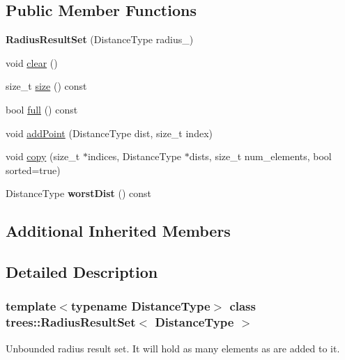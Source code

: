 \subsection*{Public Member Functions}
\begin{DoxyCompactItemize}
\item 
\mbox{\label{classtrees_1_1_radius_result_set_a0db3556f2cbe54ef66ca8c3f1d753592}} 
{\bfseries Radius\+Result\+Set} (Distance\+Type radius\+\_\+)
\item 
void \hyperlink{classtrees_1_1_radius_result_set_a4e41825c25577341937de798be4ab659}{clear} ()
\item 
size\+\_\+t \hyperlink{classtrees_1_1_radius_result_set_a4ac769fcfb64d84d46d0eb233d4681da}{size} () const
\item 
bool \hyperlink{classtrees_1_1_radius_result_set_a25ad92a894e2b78556bb3c781b2cc173}{full} () const
\item 
void \hyperlink{classtrees_1_1_radius_result_set_a65652623444c8beb35a1d27a86117b2a}{add\+Point} (Distance\+Type dist, size\+\_\+t index)
\item 
void \hyperlink{classtrees_1_1_radius_result_set_aad21bfbfd64e9e1a4fb5d5f80daf84b8}{copy} (size\+\_\+t $\ast$indices, Distance\+Type $\ast$dists, size\+\_\+t num\+\_\+elements, bool sorted=true)
\item 
\mbox{\label{classtrees_1_1_radius_result_set_a676e9763ca183b970e5cda2f39ffcbc5}} 
Distance\+Type {\bfseries worst\+Dist} () const
\end{DoxyCompactItemize}
\subsection*{Additional Inherited Members}


\subsection{Detailed Description}
\subsubsection*{template$<$typename Distance\+Type$>$\newline
class trees\+::\+Radius\+Result\+Set$<$ Distance\+Type $>$}

Unbounded radius result set. It will hold as many elements as are added to it. 

